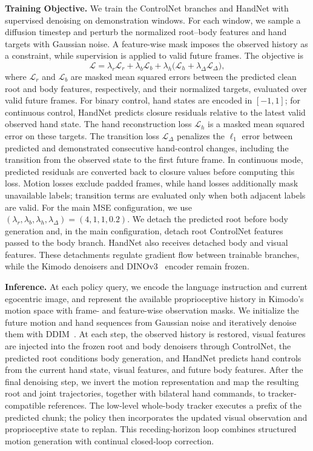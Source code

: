 \textbf{Training Objective.} We train the ControlNet branches and HandNet with supervised denoising on demonstration windows. For each window, we sample a diffusion timestep and perturb the normalized root--body features and hand targets with Gaussian noise. A feature-wise mask imposes the observed history as a constraint, while supervision is applied to valid future frames. The objective is
\begin{equation}
  \mathcal{L}=\lambda_r\mathcal{L}_{r}+\lambda_b\mathcal{L}_{b}
  +\lambda_h\bigl(\mathcal{L}_{h}+\lambda_{\Delta}\mathcal{L}_{\Delta}\bigr),
  \label{eq:policy_training_objective}
\end{equation}
where $\mathcal{L}_{r}$ and $\mathcal{L}_{b}$ are masked mean squared errors between the predicted clean root and body features, respectively, and their normalized targets, evaluated over valid future frames. For binary control, hand states are encoded in $[-1,1]$; for continuous control, HandNet predicts closure residuals relative to the latest valid observed hand state. The hand reconstruction loss $\mathcal{L}_{h}$ is a masked mean squared error on these targets. The transition loss $\mathcal{L}_{\Delta}$ penalizes the $\ell_1$ error between predicted and demonstrated consecutive hand-control changes, including the transition from the observed state to the first future frame. In continuous mode, predicted residuals are converted back to closure values before computing this loss. Motion losses exclude padded frames, while hand losses additionally mask unavailable labels; transition terms are evaluated only when both adjacent labels are valid. For the main MSE configuration, we use $(\lambda_r,\lambda_b,\lambda_h,\lambda_{\Delta})=(4,1,1,0.2)$. We detach the predicted root before body generation and, in the main configuration, detach root ControlNet features passed to the body branch. HandNet also receives detached body and visual features. These detachments regulate gradient flow between trainable branches, while the Kimodo denoisers and DINOv3~\cite{dinov3} encoder remain frozen.

\textbf{Inference.} At each policy query, we encode the language instruction and current egocentric image, and represent the available proprioceptive history in Kimodo's motion space with frame- and feature-wise observation masks. We initialize the future motion and hand sequences from Gaussian noise and iteratively denoise them with DDIM~\cite{song2022denoisingdiffusionimplicitmodels}. At each step, the observed history is restored, visual features are injected into the frozen root and body denoisers through ControlNet, the predicted root conditions body generation, and HandNet predicts hand controls from the current hand state, visual features, and future body features. After the final denoising step, we invert the motion representation and map the resulting root and joint trajectories, together with bilateral hand commands, to tracker-compatible references. The low-level whole-body tracker executes a prefix of the predicted chunk; the policy then incorporates the updated visual observation and proprioceptive state to replan. This receding-horizon loop combines structured motion generation with continual closed-loop correction.
